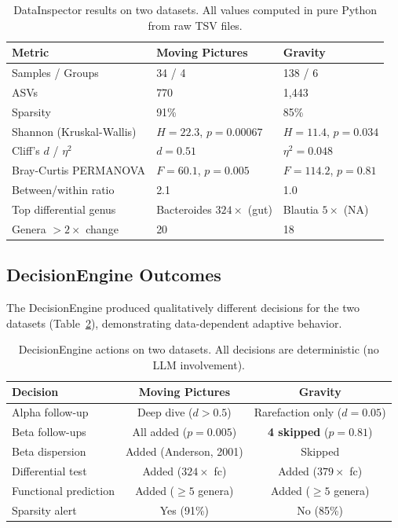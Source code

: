 \documentclass[11pt,a4paper]{article}
\begin{document}
\begin{table}[t]
\centering
\caption{DataInspector results on two datasets.
All values computed in pure Python from raw TSV files.}
\label{tab:datainspector}
\small
\begin{tabular}{@{}lll@{}}
\toprule
\textbf{Metric} & \textbf{Moving Pictures} & \textbf{Gravity} \\
\midrule
Samples / Groups & 34 / 4 & 138 / 6 \\
ASVs & 770 & 1,443 \\
Sparsity & 91\% & 85\% \\
\midrule
Shannon (Kruskal-Wallis) & $H = 22.3$, $p = 0.00067$ & $H = 11.4$, $p = 0.034$ \\
Cliff's $d$ / $\eta^2$ & $d = 0.51$ & $\eta^2 = 0.048$ \\
\midrule
Bray-Curtis PERMANOVA & $F = 60.1$, $p = 0.005$ & $F = 114.2$, $p = 0.81$ \\
Between/within ratio & 2.1 & 1.0 \\
\midrule
Top differential genus & Bacteroides $324\times$ (gut) & Blautia $5\times$ (NA) \\
Genera $> 2\times$ change & 20 & 18 \\
\bottomrule
\end{tabular}
\end{table}

\subsection{DecisionEngine Outcomes}
\label{sec:eval-decisions}

The DecisionEngine produced qualitatively different decisions for the
two datasets (Table~\ref{tab:decisions}), demonstrating data-dependent
adaptive behavior.

\begin{table}[t]
\centering
\caption{DecisionEngine actions on two datasets.
All decisions are deterministic (no LLM involvement).}
\label{tab:decisions}
\small
\begin{tabular}{@{}lcc@{}}
\toprule
\textbf{Decision} & \textbf{Moving Pictures} & \textbf{Gravity} \\
\midrule
Alpha follow-up & Deep dive ($d > 0.5$) & Rarefaction only ($d = 0.05$) \\
Beta follow-ups & All added ($p = 0.005$) & \textbf{4 skipped} ($p = 0.81$) \\
Beta dispersion & Added (Anderson, 2001) & Skipped \\
Differential test & Added ($324\times$ fc) & Added ($379\times$ fc) \\
Functional prediction & Added ($\geq 5$ genera) & Added ($\geq 5$ genera) \\
Sparsity alert & Yes (91\%) & No (85\%) \\
\bottomrule
\end{tabular}
\end{table}
\end{document}
